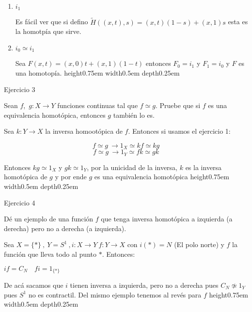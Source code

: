 \documentclass[11pt]{article}
\newenvironment{proof}[1][Demostraci\'on]{\begin{trivlist}
\item[\hskip \labelsep {\bfseries #1}]}{\end{trivlist}}
\newcommand{\qed}{\nobreak \ifvmode \relax \else
      \ifdim\lastskip<1.5em \hskip-\lastskip
      \hskip1.5em plus0em minus0.5em \fi \nobreak
      \vrule height0.75em width0.5em depth0.25em\fi}
\begin{document}
\begin{enumerate}
\begin{proof}
\begin{enumerate}
Por otro lado $pi_0 (x) = p (x,0) = x$ entonces $pi_= = 1_{X}$ y por ende $i_0$ es una equivalencia homot\'opica.

\item {$i_1$}

Es f\'acil ver que si defino $\tilde{H} ((x,t),s) = (x,t)(1-s) + (x,1)s$ esta es la homotp\'ia que sirve.

\item {$i_0 \simeq i_1$}

Sea $F(x,t) = (x,0)t + (x,1)(1-t)$ entonces $F_0 = i_1$ y $F_1 = i_0$ y $F$ es una homotop\'ia. \qed

\end{enumerate}

\end{proof}

\item {Ejercicio 3}

Sean $f$,~$g:X\to Y$ funciones continuas tal que
$f\simeq g$. Pruebe que si $f$ es una equivalencia homot\'opica, entonces $g$ tambi\'en lo es.

\begin{proof}

Sea $k:Y \rightarrow X$ la inversa homoot\'opica de $f$. Entonces si usamos el ejercicio 1:

$$f \simeq g \ \rightarrow 1_X \simeq kf \simeq kg$$
$$f \simeq g \ \rightarrow 1_Y \simeq fk \simeq gk$$

Entonces $kg \simeq 1_X$ y $gk \simeq 1_Y$, por la unicidad de la inversa, $k$ es la inversa homot\'opica de $g$ y por ende $g$ es una equivalencia homot\'opica \qed

\end{proof}

\item {Ejercicio 4}

D\'e un ejemplo de una funci\'on $f$ que tenga inversa homot\'opica a izquierda (a
derecha) pero no a derecha (a izquierda).

\begin{proof}

Sea $X = \{*\} \ , \ Y=S^{1} \ , i: X \rightarrow Y \ f:Y \rightarrow X$ con $i(*) = N$ (El polo norte)  y $f$ la funci\'on que lleva todo al punto $*$. Entonces:

$if =C_N \quad fi = 1_{\{*\}}$

De ac\'a sacamos que $i$ tienen inversa a izquierda, pero no a derecha pues $C_N \not\simeq 1_Y$ pues $S^1$ no es contractil. Del mismo ejemplo tenemos al rev\'es para $f$ \qed


\end{proof}
\end{enumerate}
\end{document}
